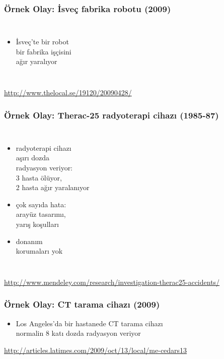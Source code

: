 \documentclass[dvipsnames]{beamer}
\theoremstyle{definition}
\theoremstyle{example}
\theoremstyle{plain}
\begin{document}
\begin{frame}
  \frametitle{Örnek Olay: İsveç fabrika robotu (2009)}

  \begin{columns}

    \begin{itemize}
      \item İsveç'te bir robot\\
        bir fabrika işçisini\\
        ağır yaralıyor
    \end{itemize}
  \end{columns}

  \medskip
  \tiny{\url{http://www.thelocal.se/19120/20090428/}}
\end{frame}

\begin{frame}
  \frametitle{Örnek Olay: Therac-25 radyoterapi cihazı (1985-87)}

  \begin{columns}

    \begin{itemize}
      \item radyoterapi cihazı\\
        aşırı dozda\\
        radyasyon veriyor:\\
        3 hasta ölüyor,\\
        2 hasta ağır yaralanıyor

      \item çok sayıda hata:\\
        arayüz tasarımı,\\
        yarış koşulları
      \item donanım\\
        korumaları yok
    \end{itemize}
  \end{columns}

  \medskip
  \tiny{\url{http://www.mendeley.com/research/investigation-therac25-accidents/}}
\end{frame}

\begin{frame}
  \frametitle{Örnek Olay: CT tarama cihazı (2009)}

  \begin{center}
  \end{center}

  \begin{itemize}
    \item Los Angeles'da bir hastanede CT tarama cihazı\\
      normalin 8 katı dozda radyasyon veriyor
  \end{itemize}

  \medskip
  \tiny{\url{http://articles.latimes.com/2009/oct/13/local/me-cedars13}}
\end{frame}
\end{document}
